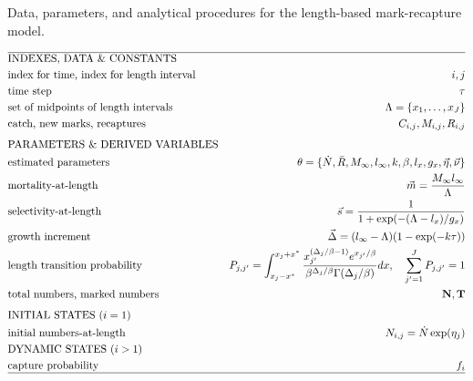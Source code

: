 \begin{table}
  \centering
\caption{Data, parameters, and analytical procedures for the length-based mark-recapture model.}\label{Table:LSMRmodel} 
\tableEq
    \begin{align}
        \hline
		&\mbox{INDEXES, DATA \& CONSTANTS} &\nonumber\\
		&\mbox{index for time, index for length interval} 
		&i,j \\
		&\mbox{time step}  & \tau\\
		&\mbox{set of midpoints of length intervals}
		&\Lambda = \{x_1, \ldots,x_J\}\\
		&\mbox{catch, new marks, recaptures} 
		&C_{i,j}, M_{i,j}, R_{i,j}\\[1ex]
		&\mbox{PARAMETERS \& DERIVED VARIABLES} &\nonumber\\
		&\mbox{estimated parameters} 
		&\theta=\{\dot{N},\bar{R},M_\infty,l_\infty,k,\beta,l_x,g_x,
			\vec{\eta},\vec{\nu} \}\\
		&\mbox{mortality-at-length} 
		& \vec{m} = \frac{M_\infty l_\infty}{\Lambda}\\
		&\mbox{selectivity-at-length} 
		& \vec{s} = \frac{1}{1+\exp(-(\Lambda-l_x)/g_x)}\\
		&\mbox{growth increment} 
		& \vec{\Delta} = (l_\infty-\Lambda)(1-\exp(-k \tau))  \\
		&\mbox{length transition probability}
		& P_{j,j'} =\int_{x_j-x^*}^{x_j+x^*} \frac{x_{j'}^{(\Delta_{j}/\beta-1)}
		e^{x_{j'}/\beta}}{\beta^{\Delta_{j}/\beta} \Gamma(\Delta_{j}/\beta)}dx, 
		\quad \sum_{j'=1}^J P_{j,j'}= 1 \\
		&\mbox{total numbers, marked numbers} 
		& \mathbf{N}, \mathbf{T}\\[1ex]
		&\mbox{INITIAL STATES ($i=1$)}  \nonumber\\
		&\mbox{initial numbers-at-length}\quad
		&N_{i,j} = \dot{N}\exp(\eta_j)\\
		&\mbox{DYNAMIC STATES ($i>1$)} \nonumber\\
		&\mbox{capture probability} 
		& f_i\\
		\hline \nonumber
    \end{align}
    \normalEq
\end{table}



